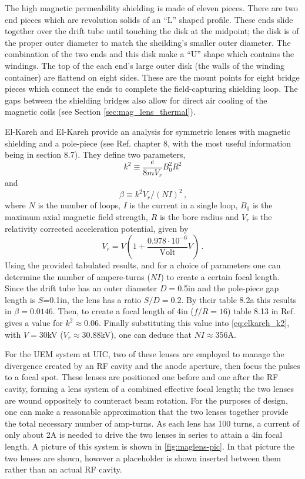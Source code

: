 The high magnetic permeability shielding is made of eleven pieces.
There are two end pieces which are revolution solids of an ``L'' shaped profile.
These ends slide together over the drift tube until touching the disk at the midpoint; the disk is of the proper outer diameter to match the sheilding's smaller outer diameter.
The combination of the two ends and this disk make a ``U'' shape which contains the windings.
The top of the each end's large outer disk (the walls of the winding container) are flattend on eight sides.
These are the mount points for eight bridge pieces which connect the ends to complete the field-capturing shielding loop.
The gaps between the shielding bridges also allow for direct air cooling of the magnetic coils (see Section \ref{sec:mag_lens_thermal}).

El-Kareh and El-Kareh provide an analysis for symmetric lenses with magnetic shielding and a pole-piece (see Ref. \cite{el-kareh_electron_1970} chapter 8, with the most useful information being in section 8.7).
They define two parameters,
\begin{equation}
  k^2 \equiv \frac{e}{8 m V_r} B_0^2 R^2
\end{equation}
and
\begin{equation} \label{eq:elkareh_k2}
  \beta \equiv k^2 V_r / (NI)^2 \,\text{,}
\end{equation}
where $N$ is the number of loops, $I$ is the current in a single loop, $B_0$ is the maximum axial magnetic field strength, $R$ is the bore radius and $V_r$ is the relativity corrected acceleration potential, given by
\begin{equation}
  V_r = V ( 1 + \frac{0.978 \cdot 10^{-6}}{\text{Volt}} V ) \,\text{.}
\end{equation}
Using the provided tabulated results, and for a choice of parameters one can determine the number of ampere-turns ($NI$) to create a certain focal length.
Since the drift tube has an outer diameter $D=$0.5in and the pole-piece gap length is $S$=0.1in, the lens has a ratio $S/D=0.2$.
By their table 8.2a this results in $\beta=0.0146$.
Then, to create a focal length of 4in ($f/R=16$) table 8.13 in Ref. \cite{el-kareh_electron_1970} gives a value for $k^2 \approx 0.06$.
Finally substituting this value into \ref{eq:elkareh_k2}, with $V=30$kV ($V_r\approx30.88$kV), one can deduce that $NI\approx356$A.

For the UEM system at UIC, two of these lenses are employed to manage the divergence created by an RF cavity and the anode aperture, then focus the pulses to a focal spot. 
These lenses are positioned one before and one after the RF cavity, forming a lens system of a combined effective focal length; the two lenses are wound oppositely to counteract beam rotation.
For the purposes of design, one can make a reasonable approximation that the two lenses together provide the total necessary number of amp-turns.
As each lens has 100 turns, a current of only about 2A is needed to drive the two lenses in series to attain a 4in focal length.
A picture of this system is shown in \ref{fig:maglens-pic}.
In that picture the two lenses are shown, however a placeholder is shown inserted between them rather than an actual RF cavity.

